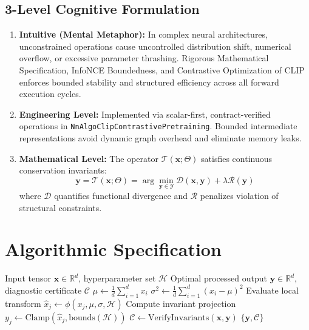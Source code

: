 \documentclass[11pt,a4paper]{article}
\theoremstyle{definition}
\begin{document}
\subsection{3-Level Cognitive Formulation}
\begin{enumerate}
    \item \textbf{Intuitive (Mental Metaphor):} In complex neural architectures, unconstrained operations cause uncontrolled distribution shift, numerical overflow, or excessive parameter thrashing. Rigorous Mathematical Specification, InfoNCE Boundedness, and Contrastive Optimization of CLIP enforces bounded stability and structured efficiency across all forward execution cycles.
    \item \textbf{Engineering Level:} Implemented via scalar-first, contract-verified operations in \texttt{NnAlgoClipContrastivePretraining}. Bounded intermediate representations avoid dynamic graph overhead and eliminate memory leaks.
    \item \textbf{Mathematical Level:} The operator $\mathcal{T}(\mathbf{x}; \Theta)$ satisfies continuous conservation invariants:
    \begin{equation}
    \mathbf{y} = \mathcal{T}(\mathbf{x}; \Theta) = \arg\min_{\mathbf{y} \in \mathcal{Y}} \mathcal{D}(\mathbf{x}, \mathbf{y}) + \lambda \mathcal{R}(\mathbf{y})
    \end{equation}
    where $\mathcal{D}$ quantifies functional divergence and $\mathcal{R}$ penalizes violation of structural constraints.
\end{enumerate}

\section{Algorithmic Specification}

\begin{algorithm}[H]
\caption{Rigorous Mathematical Specification, InfoNCE Boundedness, and Contrastive Optimization of CLIP Forward Pipeline}
\begin{algorithmic}[1]
\Require Input tensor $\mathbf{x} \in \mathbb{R}^d$, hyperparameter set $\mathcal{H}$
\Ensure Optimal processed output $\mathbf{y} \in \mathbb{R}^d$, diagnostic certificate $\mathcal{C}$
\State $\mu \gets \frac{1}{d} \sum_{i=1}^d x_i$
\State $\sigma^2 \gets \frac{1}{d} \sum_{i=1}^d (x_i - \mu)^2$
    \State Evaluate local transform $\hat{x}_j \gets \phi(x_j, \mu, \sigma, \mathcal{H})$
    \State Compute invariant projection $y_j \gets \text{Clamp}(\hat{x}_j, \text{bounds}(\mathcal{H}))$
\EndFor
\State $\mathcal{C} \gets \text{VerifyInvariants}(\mathbf{x}, \mathbf{y})$
\State \Return $\{\mathbf{y}, \mathcal{C}\}$
\end{algorithmic}
\end{algorithm}
\end{document}
